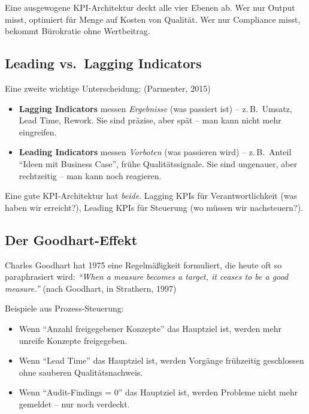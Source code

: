 \documentclass[11pt,a4paper,oneside]{article}
\newcommand{\fachbegriff}[1]{\textbf{#1}}
\newcommand{\quelle}[1]{{\footnotesize\color{lpGray}(#1)}}
\begin{document}
\noindent Eine ausgewogene KPI-Architektur deckt alle vier Ebenen ab. Wer nur Output misst, optimiert für Menge auf Kosten von Qualität. Wer nur Compliance misst, bekommt Bürokratie ohne Wertbeitrag.

\subsection{Leading vs.\ Lagging Indicators}

Eine zweite wichtige Unterscheidung: \quelle{Parmenter, 2015}

\begin{itemize}
  \item \fachbegriff{Lagging Indicators} messen \emph{Ergebnisse} (was passiert ist) -- z.\,B.\ Umsatz, Lead Time, Rework. Sie sind präzise, aber spät -- man kann nicht mehr eingreifen.
  \item \fachbegriff{Leading Indicators} messen \emph{Vorboten} (was passieren wird) -- z.\,B.\ Anteil ``Ideen mit Business Case'', frühe Qualitätssignale. Sie sind ungenauer, aber rechtzeitig -- man kann noch reagieren.
\end{itemize}

Eine gute KPI-Architektur hat \emph{beide}. Lagging KPIs für Verantwortlichkeit (was haben wir erreicht?), Leading KPIs für Steuerung (wo müssen wir nachsteuern?).

\subsection{Der Goodhart-Effekt}

Charles Goodhart hat 1975 eine Regelmäßigkeit formuliert, die heute oft so paraphrasiert wird: \emph{``When a measure becomes a target, it ceases to be a good measure.''} \quelle{nach Goodhart, in Strathern, 1997}

Beispiele aus Prozess-Steuerung:

\begin{itemize}
  \item Wenn ``Anzahl freigegebener Konzepte'' das Hauptziel ist, werden mehr unreife Konzepte freigegeben.
  \item Wenn ``Lead Time'' das Hauptziel ist, werden Vorgänge frühzeitig geschlossen ohne sauberen Qualitätsnachweis.
  \item Wenn ``Audit-Findings = 0'' das Hauptziel ist, werden Probleme nicht mehr gemeldet -- nur noch verdeckt.
\end{itemize}
\end{document}
